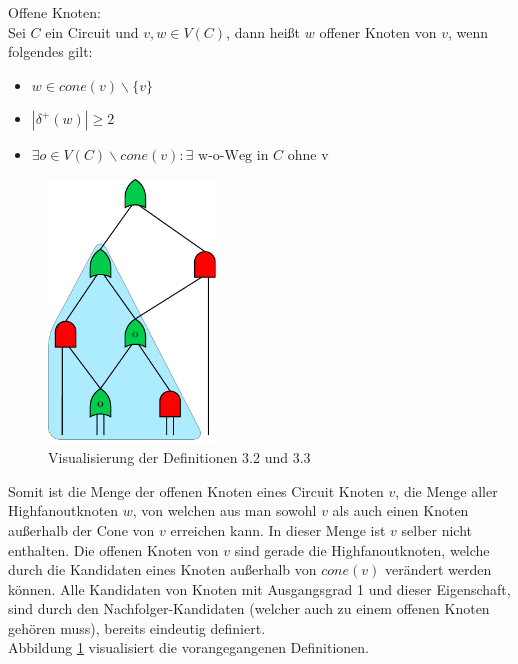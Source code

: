 \documentclass[11pt, a4paper, german]{article}
\begin{document}
\begin{definition}{Offene Knoten:}\\
	Sei $C$ ein Circuit und $v,w \in V(C)$, dann heißt $w$ offener Knoten von $v$, wenn folgendes gilt: 
	\begin{itemize}
		\item $ w \in cone(v)\backslash \{ v \} $
		\item $| \delta ^{+}(w)| \geq 2$
		\item $ \exists o \in V(C) \backslash cone(v) : \exists \text{ w-o-Weg in } C \text{ ohne v} $
	\end{itemize}	
\end{definition}
 \begin{figure}
		\includegraphics[height = 7cm]{pictures/compiled/cone}
		\caption{Visualisierung der Definitionen 3.2 und 3.3}
		\label{bild:cone}
\end{figure}
Somit ist die Menge der offenen Knoten eines Circuit Knoten $v$, die Menge aller Highfanoutknoten $w$, von welchen aus man sowohl $v$ als auch einen Knoten außerhalb der Cone von $v$ erreichen kann. In dieser Menge ist $v$ selber nicht enthalten. Die offenen Knoten von $v$ sind gerade die Highfanoutknoten, welche durch die Kandidaten eines Knoten außerhalb von $cone(v)$ verändert werden können. Alle Kandidaten von  Knoten mit Ausgangsgrad 1 und dieser Eigenschaft, sind durch den Nachfolger-Kandidaten (welcher auch zu einem offenen Knoten gehören muss), bereits eindeutig definiert. \\
Abbildung \ref{bild:cone} visualisiert die vorangegangenen Definitionen.
\end{document}
